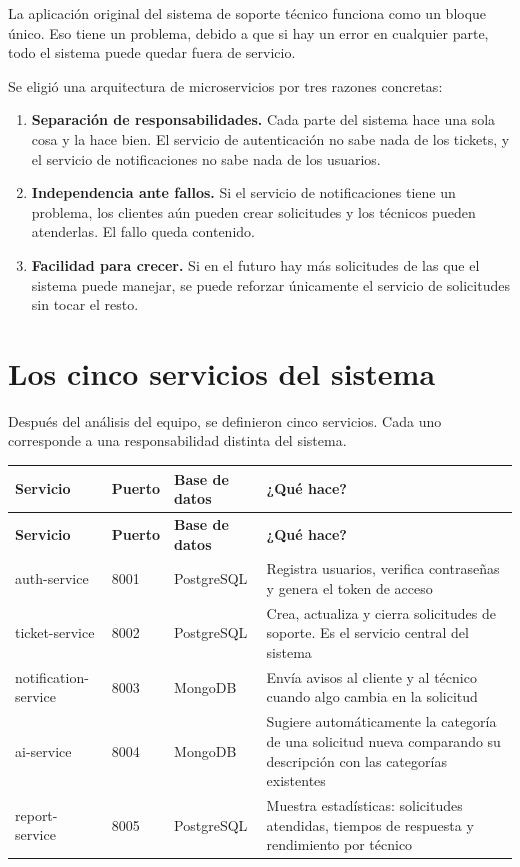 \documentclass[12pt, a4paper]{report}
\begin{document}
La aplicación original del sistema de soporte técnico funciona como un
bloque único. Eso tiene un problema, debido a que si hay un error en cualquier
parte, todo el sistema puede quedar fuera de servicio.

Se eligió una arquitectura de microservicios por tres razones concretas:

\begin{enumerate}
  \item \textbf{Separación de responsabilidades.} Cada parte del
        sistema hace una sola cosa y la hace bien. El servicio de
        autenticación no sabe nada de los tickets, y el servicio de
        notificaciones no sabe nada de los usuarios.

  \item \textbf{Independencia ante fallos.} Si el servicio de
        notificaciones tiene un problema, los clientes aún pueden
        crear solicitudes y los técnicos pueden atenderlas. El fallo
        queda contenido.

  \item \textbf{Facilidad para crecer.} Si en el futuro hay más
        solicitudes de las que el sistema puede manejar, se puede
        reforzar únicamente el servicio de solicitudes sin tocar
        el resto.
\end{enumerate}

\newpage
\section{Los cinco servicios del sistema}

Después del análisis del equipo, se definieron cinco servicios.
Cada uno corresponde a una responsabilidad distinta del sistema.

\begin{longtable}{|p{3.8cm}|p{2cm}|p{2.2cm}|p{4.5cm}|}
\hline
\textbf{Servicio} & \textbf{Puerto} & \textbf{Base de datos} &
\textbf{¿Qué hace?} \\
\hline
\endfirsthead
\hline
\textbf{Servicio} & \textbf{Puerto} & \textbf{Base de datos} &
\textbf{¿Qué hace?} \\
\hline
\endhead
auth-service & 8001 & PostgreSQL &
Registra usuarios, verifica contraseñas y
genera el token de acceso \\
\hline
ticket-service & 8002 & PostgreSQL &
Crea, actualiza y cierra solicitudes de soporte.
Es el servicio central del sistema \\
\hline
notification-service & 8003 & MongoDB &
Envía avisos al cliente y al técnico cuando
algo cambia en la solicitud \\
\hline
ai-service & 8004 & MongoDB &
Sugiere automáticamente la categoría de una
solicitud nueva comparando su descripción
con las categorías existentes \\
\hline
report-service & 8005 & PostgreSQL &
Muestra estadísticas: solicitudes atendidas,
tiempos de respuesta y rendimiento por técnico \\
\hline
\end{longtable}
\end{document}
